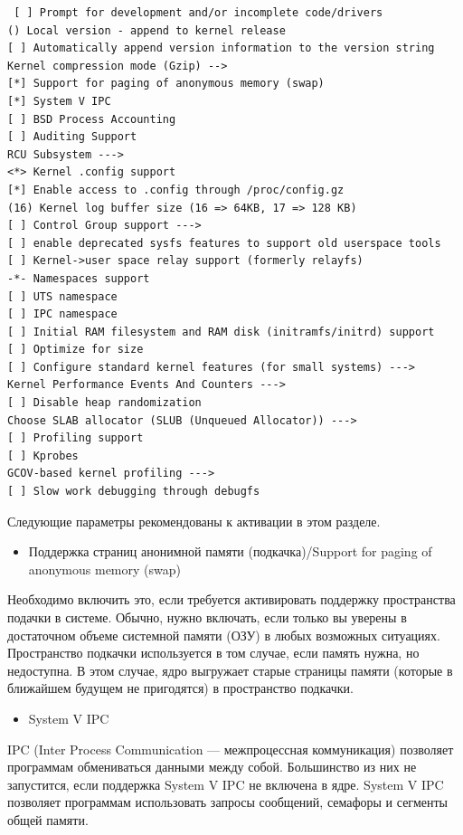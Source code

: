 \documentclass[10pt]{book}
\begin{document}
\vspace{3mm}
\begin{tcolorbox}[colback=gray!14!white, colframe=blue!75!blue]
\begin{lstlisting}
 [ ] Prompt for development and/or incomplete code/drivers
() Local version - append to kernel release
[ ] Automatically append version information to the version string
Kernel compression mode (Gzip) -->
[*] Support for paging of anonymous memory (swap)
[*] System V IPC
[ ] BSD Process Accounting
[ ] Auditing Support
RCU Subsystem --->
<*> Kernel .config support
[*] Enable access to .config through /proc/config.gz
(16) Kernel log buffer size (16 => 64KB, 17 => 128 KB)
[ ] Control Group support --->
[ ] enable deprecated sysfs features to support old userspace tools
[ ] Kernel->user space relay support (formerly relayfs)
-*- Namespaces support
[ ] UTS namespace
[ ] IPC namespace
[ ] Initial RAM filesystem and RAM disk (initramfs/initrd) support
[ ] Optimize for size
[ ] Configure standard kernel features (for small systems) --->
Kernel Performance Events And Counters --->
[ ] Disable heap randomization
Choose SLAB allocator (SLUB (Unqueued Allocator)) --->
[ ] Profiling support
[ ] Kprobes
GCOV-based kernel profiling --->
[ ] Slow work debugging through debugfs
\end{lstlisting}
\end{tcolorbox}
Следующие параметры рекомендованы к активации в этом разделе.

\begin{itemize}
\item Поддержка страниц анонимной памяти (подкачка)/Support for paging of anonymous memory (swap) 
\end{itemize}

Необходимо включить это, если требуется активировать поддержку пространства подачки в системе. Обычно, нужно включать, если только вы уверены в достаточном объеме системной памяти (ОЗУ) в любых возможных ситуациях. Пространство подкачки используется в том случае, если память нужна, но недоступна. В этом случае, ядро выгружает старые страницы памяти (которые в ближайшем будущем не пригодятся) в пространство подкачки.  

\begin{itemize}
\item System V IPC
\end{itemize}

IPC (Inter Process Communication — межпроцессная коммуникация) позволяет программам обмениваться данными между собой. Большинство из них не запустится, если поддержка  System V IPC не включена в ядре.  System V IPC позволяет программам использовать запросы сообщений, семафоры и сегменты общей памяти.
\end{document}
